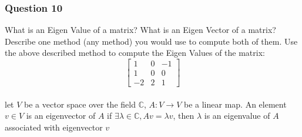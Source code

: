 \documentclass[12pt, border = 4pt, multi]{article} %
\begin{document}
\subsubsection*{Question 10}
What is an Eigen Value of a matrix? 
What is an Eigen Vector of a matrix? 
Describe one method (any method) you 
would use to compute both of them. 
Use the above described method to compute 
the Eigen Values of the matrix:
\begin{equation}
    \left[ 
        \begin{array}{ccc}
         1 & 0 & -1 \\ 
         1 & 0 & 0 \\
        -2 & 2 & 1 
        \end{array} 
    \right]
\end{equation}
\\
let $V$ be a vector space over the field $\mathbb{C}$, $A: V \rightarrow V$ be a linear map. An element $v \in V$ is an eigenvector of $A$ if $\exists \lambda \in \mathbb{C}, Av = \lambda v$, then $\lambda$ is an eigenvalue of $A$ associated with eigenvector $v$
\end{document}
